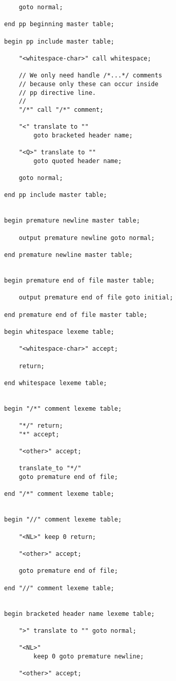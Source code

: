 \documentclass[12pt]{article}
\newenvironment{indpar}[1][0.3in]%
	{\begin{list}{}%
		     {\setlength{\itemsep}{0in}%
		      \setlength{\topsep}{0in}%
		      \setlength{\parsep}{1ex}%
		      \setlength{\labelwidth}{#1}%
		      \setlength{\leftmargin}{#1}%
		      \addtolength{\leftmargin}{\labelsep}}%
	 \item}%
	{\end{list}}
\begin{document}
\begin{indpar}
\begin{verbatim}
    goto normal;

end pp beginning master table;

begin pp include master table;

    "<whitespace-char>" call whitespace;

    // We only need handle /*...*/ comments
    // because only these can occur inside
    // pp directive line.
    //
    "/*" call "/*" comment;

    "<" translate to ""
        goto bracketed header name;

    "<Q>" translate to ""
        goto quoted header name;

    goto normal;

end pp include master table;


begin premature newline master table;

    output premature newline goto normal;

end premature newline master table;


begin premature end of file master table;

    output premature end of file goto initial;

end premature end of file master table;

begin whitespace lexeme table;

    "<whitespace-char>" accept;

    return;

end whitespace lexeme table;


begin "/*" comment lexeme table;

    "*/" return;
    "*" accept;

    "<other>" accept;

    translate_to "*/"
    goto premature end of file;

end "/*" comment lexeme table;


begin "//" comment lexeme table;

    "<NL>" keep 0 return;

    "<other>" accept;

    goto premature end of file;

end "//" comment lexeme table;


begin bracketed header name lexeme table;

    ">" translate to "" goto normal;

    "<NL>"
        keep 0 goto premature newline;

    "<other>" accept;


\end{verbatim}
\end{indpar}
\end{document}
